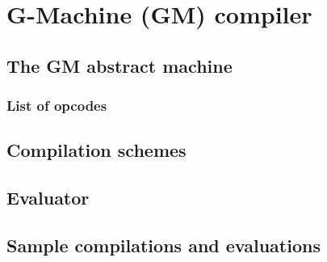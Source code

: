\section{G-Machine (GM) compiler}
\label{sec:gm}

\subsection{The GM abstract machine}
\label{sec:gm-machine}

\subsubsection{List of opcodes}
\label{sec:gm-opcodes}



\subsection{Compilation schemes}
\label{sec:compilation-schemes}

\subsection{Evaluator}
\label{sec:evaluator}

\subsection{Sample compilations and evaluations}
\label{sec:compiler-examples}

